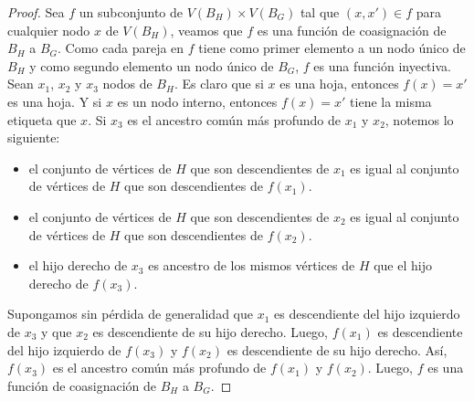 \begin{proof}
Sea $f$ un subconjunto de $V(B_H) \times V(B_G)$ tal que $(x,x')\in f$ para cualquier nodo $x$ de $V(B_H)$, veamos que $f$ es una función de coasignación de $B_H$ a $B_G$. Como cada pareja en $f$ tiene como primer elemento a un nodo único de $B_H$ y como segundo elemento un nodo único de $B_G$, $f$ es una función inyectiva. Sean $x_1$, $x_2$ y $x_3$ nodos de $B_H$. Es claro que si $x$ es una hoja, entonces $f(x)=x'$ es una hoja. Y si $x$ es un nodo interno, entonces $f(x)=x'$ tiene la misma etiqueta que $x$. Si $x_3$ es el ancestro común más profundo de $x_1$ y $x_2$, notemos lo siguiente:
\begin{itemize}
    \item el conjunto de vértices de $H$ que son descendientes de $x_1$ es igual al conjunto de vértices de $H$ que son descendientes de $f(x_1)$.
    \item el conjunto de vértices de $H$ que son descendientes de $x_2$ es igual al conjunto de vértices de $H$ que son descendientes de $f(x_2)$.
    \item el hijo derecho de $x_3$ es ancestro de los mismos vértices de $H$ que el hijo derecho de $f(x_3)$.
\end{itemize}
Supongamos sin pérdida de generalidad que $x_1$ es descendiente del hijo izquierdo de $x_3$ y que $x_2$ es descendiente de su hijo derecho. Luego,  $f(x_1)$ es descendiente del hijo izquierdo de $f(x_3)$ y $f(x_2)$ es descendiente de su hijo derecho. Así, $f(x_3)$ es el ancestro común más profundo de $f(x_1)$ y $f(x_2)$. Luego, $f$ es una función de coasignación de $B_H$ a $B_G$.

\end{proof}
